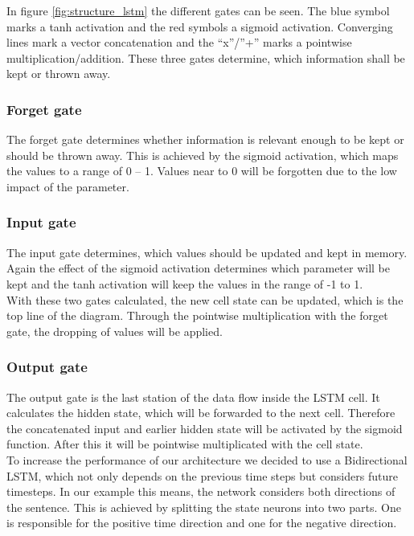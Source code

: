 \documentclass[hidelinks, conference]{IEEEtran}
\begin{document}
In figure \ref{fig:structure_lstm} the different gates can be seen. The blue symbol marks a tanh activation and the red symbols a sigmoid activation. Converging lines mark a vector concatenation and the “x”/”+” marks a pointwise multiplication/addition. These three gates determine, which information shall be kept or thrown away. 

\subsubsection{Forget gate}

The forget gate determines whether information is relevant enough to be kept or should be thrown away. This is achieved by the sigmoid activation, which maps the values to a range of 0 – 1. Values near to 0 will be forgotten due to the low impact of the parameter.

\subsubsection{Input gate}

The input gate determines, which values should be updated and kept in memory. Again the effect of the sigmoid activation determines which parameter will be kept and the tanh activation will keep the values in the range of -1 to 1.\\
With these two gates calculated, the new cell state can be updated, which is the top line of the diagram. Through the pointwise multiplication with the forget gate, the dropping of values will be applied.

\subsubsection{Output gate}

The output gate is the last station of the data flow inside the LSTM cell. It calculates the hidden state, which will be forwarded to the next cell. Therefore the concatenated input and earlier hidden state will be activated by the sigmoid function. After this it will be pointwise multiplicated with the cell state.\\
To increase the performance of our architecture we decided to use a Bidirectional LSTM, which not only depends on the previous time steps but considers future timesteps. In our example this means, the network considers both directions of the sentence. This is achieved by splitting the state neurons into two parts. One is responsible for the positive time direction and one for the negative direction.
\end{document}
